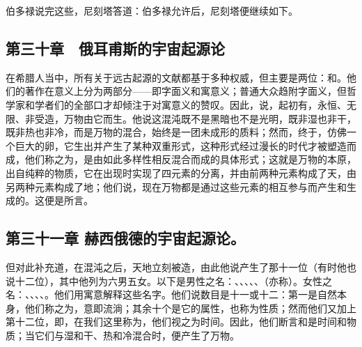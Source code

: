 伯多禄说完这些，尼刻塔答道：伯多禄允许后，尼刻塔便继续如下。\par


\subsection{第三十章　俄耳甫斯的宇宙起源论}

在希腊人当中，所有关于远古起源的文献都基于多种权威，但主要是两位：和。他们的著作在意义上分为两部分——即字面义和寓意义；普通大众趋附字面义，但哲学家和学者们的全部口才却倾注于对寓意义的赞叹。因此，说，起初有，永恒、无限、非受造，万物由它而生。他说这混沌既不是黑暗也不是光明，既非湿也非干，既非热也非冷，而是万物的混合，始终是一团未成形的质料；然而，终于，仿佛一个巨大的卵，它生出并产生了某种双重形式，这种形式经过漫长的时代才被塑造而成，他们称之为，是由如此多样性相反混合而成的具体形式；这就是万物的本原，出自纯粹的物质，它在出现时实现了四元素的分离，并由前两种元素构成了天，由另两种元素构成了地；他们说，现在万物都是通过这些元素的相互参与而产生和生成的。这便是所言。\par


\subsection{第三十一章 赫西俄德的宇宙起源论。}

但对此补充道，在混沌之后，天地立刻被造，由此他说产生了那十一位（有时他也说十二位），其中他列为六男五女。以下是男性之名：、、、、、（亦称）。女性之名：、、、、。他们用寓意解释这些名字。他们说数目是十一或十二：第一是自然本身，他们称之为，意即流淌；其余十个是它的属性，也称为性质；然而他们又加上第十二位，即，在我们这里称为，他们视之为时间。因此，他们断言和是时间和物质；当它们与湿和干、热和冷混合时，便产生了万物。\par

